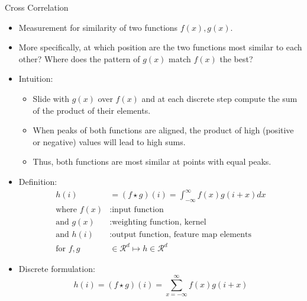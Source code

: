 \documentclass[11pt,compress,t,notes=noshow, xcolor=table]{beamer}
\begin{document}
\begin{vbframe}{Cross Correlation}
    \begin{itemize}
        \item Measurement for similarity of two functions $f(x), g(x)$.
        \item More specifically, at which position are the two functions most similar to each other? Where does the pattern of $g(x)$ match $f(x)$ the best?
        \item Intuition:
        \begin{itemize}
                \item Slide with $g(x)$ over $f(x)$ and at each discrete step compute the sum of the product of their elements.
                \item When peaks of both functions are aligned, the product of high (positive or negative) values will lead to high sums.
                \item Thus, both functions are most similar at points with equal peaks.
        \end{itemize}
    \end{itemize}
\framebreak
    \begin{itemize}
        \item Definition: \\
            \begin{equation*}
                \begin{split}
                    h(i) &= (f \star g)(i) = \int_{-\infty}^{\infty} f(x)g(i+x)dx \\
                    \text{where } f(x)&: \text{input function} \\
                    \text{and } g(x)&: \text{weighting function, kernel} \\
                    \text{and } h(i)&: \text{output function, feature map elements} \\
                    \text{for } f, g &\in \mathcal{R}^{d} \mapsto h \in \mathcal{R}^{d}
                \end{split}
            \end{equation*}
    \end{itemize}
\framebreak 
    \begin{itemize}
        \item Discrete formulation:
            \begin{equation*}
                h(i) = (f \star g)(i) = \sum_{x = -\infty}^{\infty} f(x)g(i+x)
            \end{equation*}

\end{itemize}
\end{vbframe}
\end{document}
